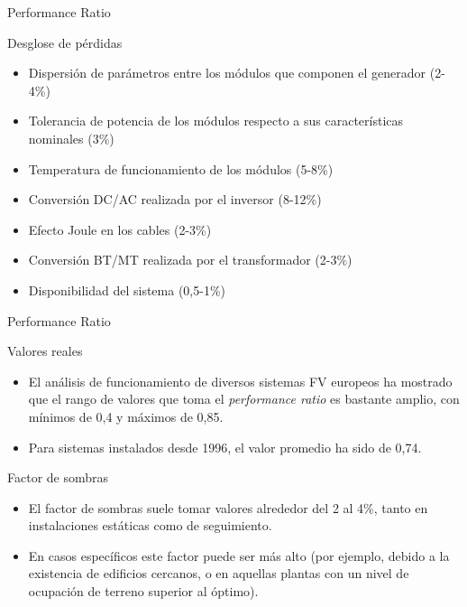 \documentclass[xcolor={usenames,svgnames,dvipsnames}]{beamer}
\begin{document}
\begin{frame}[label={sec:org9093a0b}]{Performance Ratio}
\begin{block}{Desglose de pérdidas}
\begin{itemize}
\item \alert{Dispersión de parámetros} entre los módulos que componen el
generador (2-4\%)

\item \alert{Tolerancia de potencia} de los módulos respecto a sus
características nominales (3\%)

\item \alert{Temperatura} de funcionamiento de los módulos (5-8\%)

\item Conversión DC/AC realizada por el \alert{inversor} (8-12\%)

\item \alert{Efecto Joule} en los cables (2-3\%)

\item Conversión BT/MT realizada por el \alert{transformador} (2-3\%)

\item \alert{Disponibilidad} del sistema (0,5-1\%)
\end{itemize}
\end{block}
\end{frame}

\begin{frame}[label={sec:orgcc3c0e4}]{Performance Ratio}
\begin{block}{Valores reales}
\begin{itemize}
\item El análisis de funcionamiento de diversos sistemas FV europeos ha
mostrado que el rango de valores que toma el \emph{performance ratio} es
bastante amplio, con mínimos de 0,4 y máximos de 0,85.

\item Para sistemas instalados desde 1996, \alert{el valor promedio ha sido de
0,74}.
\end{itemize}
\end{block}
\end{frame}

\begin{frame}[label={sec:org0811294}]{Factor de sombras}
\begin{itemize}
\item \alert{El factor de sombras suele tomar valores alrededor del 2 al 4\%},
tanto en instalaciones estáticas como de seguimiento.

\item En casos específicos este factor puede ser más alto (por ejemplo,
debido a la existencia de edificios cercanos, o en aquellas plantas
con un nivel de ocupación de terreno superior al óptimo).
\end{itemize}
\end{frame}
\end{document}
